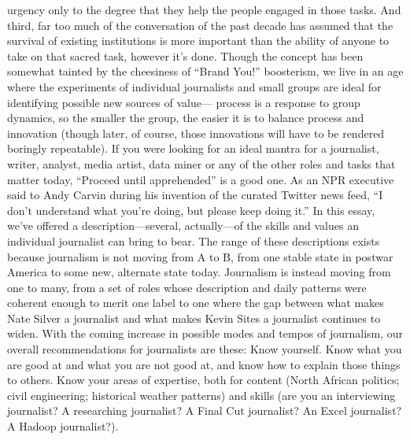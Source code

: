 urgency only to the degree that they help the people engaged in those tasks. And
third, far too much of the conversation of the past decade has assumed that the
survival of existing institutions is more important than the ability of anyone to
take on that sacred task, however it’s done.
Though the concept has been somewhat tainted by the cheesiness of ``Brand
You!'' boosterism, we live in an age where the experiments of individual journalists
and small groups are ideal for identifying possible new sources of value—
process is a response to group dynamics, so the smaller the group, the easier it is
to balance process and innovation (though later, of course, those innovations will
have to be rendered boringly repeatable).
If you were looking for an ideal mantra for a journalist, writer, analyst, media artist,
data miner or any of the other roles and tasks that matter today, ``Proceed until
apprehended'' is a good one. As an NPR executive said to Andy Carvin during
his invention of the curated Twitter news feed, ``I don’t understand what you’re
doing, but please keep doing it.''
In this essay, we’ve offered a description—several, actually—of the skills and values
an individual journalist can bring to bear. The range of these descriptions exists
because journalism is not moving from A to B, from one stable state in postwar
America to some new, alternate state today. Journalism is instead moving from one
to many, from a set of roles whose description and daily patterns were coherent
enough to merit one label to one where the gap between what makes Nate Silver
a journalist and what makes Kevin Sites a journalist continues to widen.
With the coming increase in possible modes and tempos of journalism, our overall
recommendations for journalists are these:
Know yourself. Know what you are good at and what you are not good
at, and know how to explain those things to others. Know your areas
of expertise, both for content (North African politics; civil engineering;
historical weather patterns) and skills (are you an interviewing journalist?
A researching journalist? A Final Cut journalist? An Excel journalist?
A Hadoop journalist?).

